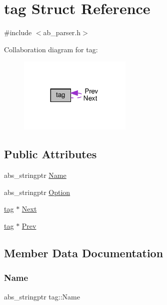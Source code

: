 \hypertarget{structtag}{}\section{tag Struct Reference}
\label{structtag}


{\ttfamily \#include $<$ab\+\_\+parser.\+h$>$}



Collaboration diagram for tag\+:
\nopagebreak
\begin{figure}[H]
\begin{center}
\leavevmode
\includegraphics[width=152pt]{db/d25/structtag__coll__graph}
\end{center}
\end{figure}
\subsection*{Public Attributes}
\begin{DoxyCompactItemize}
\item 
abs\+\_\+stringptr \hyperlink{structtag_a4564f437775d5276bcddbc23a6b8881e}{Name}
\item 
abs\+\_\+stringptr \hyperlink{structtag_aa52b4f28c97f8ff006a5fe50d6623a7e}{Option}
\item 
\hyperlink{structtag}{tag} $\ast$ \hyperlink{structtag_ae16f0e5fb461cdbae551134f3e1e8e24}{Next}
\item 
\hyperlink{structtag}{tag} $\ast$ \hyperlink{structtag_af05983b55100a16b3bcd8faad9b50e00}{Prev}
\end{DoxyCompactItemize}


\subsection{Member Data Documentation}
\mbox{\label{structtag_a4564f437775d5276bcddbc23a6b8881e}} 
\subsubsection{\texorpdfstring{Name}{Name}}
{\footnotesize\ttfamily abs\+\_\+stringptr tag\+::\+Name}

